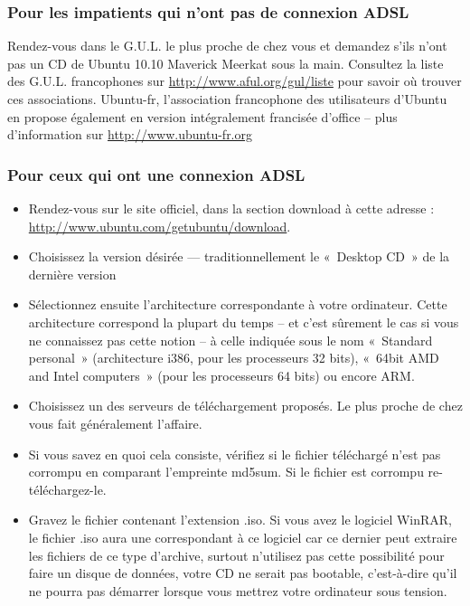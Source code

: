 \subsubsection{Pour les impatients qui n'ont pas de connexion ADSL}
Rendez-vous dans le G.U.L. le plus proche de chez vous et demandez s'ils n'ont pas un CD de Ubuntu 10.10 Maverick Meerkat sous la main. Consultez la liste des G.U.L. francophones sur \url{http://www.aful.org/gul/liste} pour savoir où trouver ces associations. Ubuntu-fr, l'association francophone des utilisateurs d'Ubuntu en propose également en version intégralement francisée d'office -- plus d'information sur \url{http://www.ubuntu-fr.org}
\subsubsection{Pour ceux qui ont une connexion ADSL}
\begin{itemize}
\item Rendez-vous sur le site officiel, dans la section download à cette adresse : \url{http://www.ubuntu.com/getubuntu/download}.
\item Choisissez la version désirée --- traditionnellement le «~Desktop CD~» de la dernière version%
\item Sélectionnez ensuite l'architecture correspondante à votre ordinateur. Cette architecture correspond la plupart du temps -- et c'est sûrement le cas si vous ne connaissez pas cette notion -- à celle indiquée sous le nom «~Standard personal~» (architecture i386, pour les processeurs 32 bits), «~64bit AMD and Intel computers~» (pour les processeurs 64 bits) ou encore ARM.
\item Choisissez un des serveurs de téléchargement proposés. Le plus proche de chez vous fait généralement l'affaire.
\item Si vous savez en quoi cela consiste, vérifiez si le fichier téléchargé n'est pas corrompu en comparant l'empreinte md5sum. Si le fichier est corrompu re-téléchargez-le.
\item Gravez le fichier contenant l'extension .iso. Si vous avez le logiciel WinRAR, le fichier .iso aura une  correspondant à ce logiciel car ce dernier peut extraire les fichiers de ce type d'archive, surtout n'utilisez pas cette possibilité pour faire un disque de données, votre CD ne serait pas bootable, c'est-à-dire qu'il ne pourra pas démarrer lorsque vous mettrez votre ordinateur sous tension.
\end{itemize}
